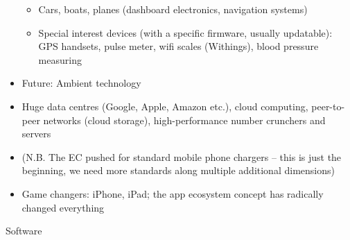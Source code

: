\begin{multicols}{2}
\begin{itemize}
\begin{itemize}
  \item Cars, boats, planes (dashboard electronics, navigation systems)
  \item Special interest devices (with a specific firmware, usually updatable): GPS handsets, pulse meter, wifi scales (Withings), blood pressure measuring
  \end{itemize}
\item Future: Ambient technology
\item Huge data centres (Google, Apple, Amazon etc.), cloud computing, peer-to-peer networks (cloud storage), high-performance number crunchers and servers
\item (N.B. The EC pushed for standard mobile phone chargers – this is just the beginning, we need more standards along multiple additional dimensions)
\item Game changers: iPhone, iPad; the app ecosystem concept has radically changed everything
\end{itemize}

Software


\end{multicols}
